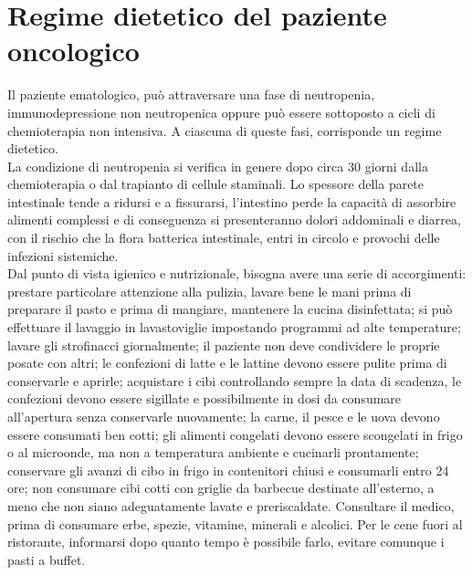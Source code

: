 \section{Regime dietetico del paziente oncologico}

Il paziente ematologico, può attraversare una fase di neutropenia, immunodepressione non neutropenica oppure può essere 
sottoposto a cicli di chemioterapia non intensiva\cite{DIETA}. A ciascuna di queste fasi, corrisponde un regime dietetico.\\
La condizione di neutropenia si verifica in genere dopo circa 30 giorni dalla chemioterapia o dal trapianto di 
cellule staminali. Lo spessore della parete intestinale tende a ridursi e a fissurarsi, l’intestino perde la capacità 
di assorbire alimenti complessi e di conseguenza si presenteranno dolori addominali e diarrea, con il 
rischio che la flora batterica intestinale, entri in circolo e provochi delle infezioni sistemiche.\\ Dal punto di vista 
igienico e nutrizionale, bisogna avere una serie di accorgimenti: prestare particolare attenzione alla 
pulizia, lavare bene le mani prima di preparare il pasto e prima di mangiare, mantenere la cucina disinfettata; si può 
effettuare il lavaggio in lavastoviglie impostando programmi ad alte temperature;
lavare gli strofinacci giornalmente; il paziente non deve condividere le proprie posate con altri; 
le confezioni di latte e le lattine devono essere pulite prima di conservarle e aprirle; 
acquistare i cibi controllando sempre la data di scadenza, le confezioni devono essere sigillate e possibilmente 
in dosi da consumare all’apertura senza conservarle nuovamente; 
la carne, il pesce e le uova devono essere consumati ben cotti; gli alimenti congelati devono essere scongelati in 
frigo o al microonde, ma non a temperatura ambiente e cucinarli prontamente; conservare gli avanzi di cibo 
in frigo in contenitori chiusi e consumarli entro 24 ore; 
non consumare cibi cotti con griglie da barbecue destinate all’esterno, a meno che 
non siano adeguatamente lavate e preriscaldate. Consultare il medico, prima di consumare erbe, spezie, vitamine, 
minerali e alcolici. Per le cene fuori al ristorante, informarsi dopo quanto tempo è possibile farlo, evitare comunque 
i pasti a buffet\cite{DIETA}.\\

